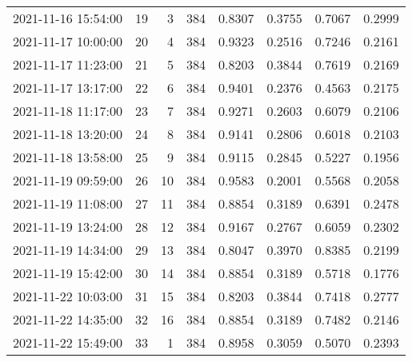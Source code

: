 \begin{table}
\begin{tabular}{lrrrrrrr}
2021-11-16 15:54:00 &   19 &    3 &    384 &   0.8307 & 0.3755 & 0.7067 & 0.2999 \\
2021-11-17 10:00:00 &   20 &    4 &    384 &   0.9323 & 0.2516 & 0.7246 & 0.2161 \\
2021-11-17 11:23:00 &   21 &    5 &    384 &   0.8203 & 0.3844 & 0.7619 & 0.2169 \\
2021-11-17 13:17:00 &   22 &    6 &    384 &   0.9401 & 0.2376 & 0.4563 & 0.2175 \\
2021-11-18 11:17:00 &   23 &    7 &    384 &   0.9271 & 0.2603 & 0.6079 & 0.2106 \\
2021-11-18 13:20:00 &   24 &    8 &    384 &   0.9141 & 0.2806 & 0.6018 & 0.2103 \\
2021-11-18 13:58:00 &   25 &    9 &    384 &   0.9115 & 0.2845 & 0.5227 & 0.1956 \\
2021-11-19 09:59:00 &   26 &   10 &    384 &   0.9583 & 0.2001 & 0.5568 & 0.2058 \\
2021-11-19 11:08:00 &   27 &   11 &    384 &   0.8854 & 0.3189 & 0.6391 & 0.2478 \\
2021-11-19 13:24:00 &   28 &   12 &    384 &   0.9167 & 0.2767 & 0.6059 & 0.2302 \\
2021-11-19 14:34:00 &   29 &   13 &    384 &   0.8047 & 0.3970 & 0.8385 & 0.2199 \\
2021-11-19 15:42:00 &   30 &   14 &    384 &   0.8854 & 0.3189 & 0.5718 & 0.1776 \\
2021-11-22 10:03:00 &   31 &   15 &    384 &   0.8203 & 0.3844 & 0.7418 & 0.2777 \\
2021-11-22 14:35:00 &   32 &   16 &    384 &   0.8854 & 0.3189 & 0.7482 & 0.2146 \\
2021-11-22 15:49:00 &   33 &    1 &    384 &   0.8958 & 0.3059 & 0.5070 & 0.2393 \\
\bottomrule
\end{tabular}
\end{table}

